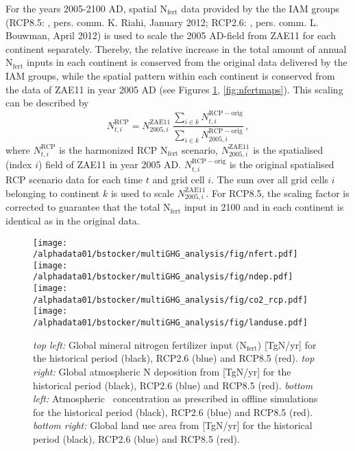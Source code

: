 For the years 2005-2100 AD, spatial N$_{\mathrm{fert}}$ data provided by the the IAM groups (RCP8.5: \citet{riahi11cc}, pers. comm. K. Riahi, January 2012; RCP2.6: \citet{vanvuuren11cc, bouwman09gbc}, pers. comm. L. Bouwman, April 2012) is used to scale the 2005 AD-field from ZAE11 for each continent separately. Thereby, the relative increase in the total amount of annual N$_{\mathrm{fert}}$ inputs in each continent is conserved from the original data delivered by the IAM groups, while the spatial pattern within each continent is conserved from the data of ZAE11 in year 2005 AD (see Figures \ref{fig:nfert_global}, \ref{fig:nfertmaps}). This scaling can be described by
\begin{equation}
N^{\mathrm{RCP}}_{t,i} = N^{\mathrm{ZAE11}}_{2005,i} \,  \frac{\sum\limits_{i\in k} N^{\mathrm{RCP-orig}}_{t,i} }{\sum\limits_{i\in k} N^{\mathrm{RCP-orig}}_{2005,i} } \, ,
\end{equation}
where $N^{\mathrm{RCP}}_{t,i}$ is the harmonized RCP N$_{\mathrm{fert}}$ scenario, $N^{\mathrm{ZAE11}}_{2005,i}$ is the spatialised (index $i$) field of ZAE11 in year 2005 AD. $N^{\mathrm{RCP-orig}}_{t,i}$ is the original spatialised RCP scenario data for each time $t$ and grid cell $i$. The sum over all grid cells $i$ belonging to continent $k$ is used to scale $N^{\mathrm{ZAE11}}_{2005,i}$. For RCP8.5, the scaling factor is corrected to guarantee that the total N$_{\mathrm{fert}}$ input in 2100 and in each continent is identical as in the original data.
\begin{figure}[ht!]
\begin{center}
\noindent\texttt{[image: /alphadata01/bstocker/multiGHG\_analysis/fig/nfert.pdf]}
\noindent\texttt{[image: /alphadata01/bstocker/multiGHG\_analysis/fig/ndep.pdf]}\\
\noindent\texttt{[image: /alphadata01/bstocker/multiGHG\_analysis/fig/co2\_rcp.pdf]}
\noindent\texttt{[image: /alphadata01/bstocker/multiGHG\_analysis/fig/landuse.pdf]}
\end{center}
\caption[Time series of external forcings]{{\it top left:} Global mineral nitrogen fertilizer input (N$_{\mathrm{fert}}$) [TgN/yr] for the historical period (black), RCP2.6 (blue) and RCP8.5 (red). {\it top right:} Global atmospheric N deposition from \citet{lamarque11cc} [TgN/yr] for the historical period (black), RCP2.6 (blue) and RCP8.5 (red). {\it bottom left:} Atmospheric \coo\ concentration as prescribed in offline simulations for the historical period (black), RCP2.6 (blue) and RCP8.5 (red). {\it bottom right:} Global land use area from \citet{hurtt06gcb} [TgN/yr] for the historical period (black), RCP2.6 (blue) and RCP8.5 (red).}
\label{fig:nfert_global}
\end{figure}
